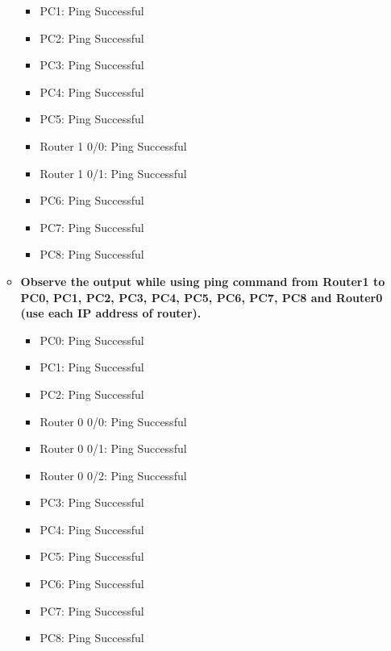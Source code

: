 \documentclass[a4paper,11pt]{article}
\begin{document}
\begin{enumerate}
\begin{itemize}
\begin{itemize}
                              \item PC1: Ping Successful
                              \item PC2: Ping Successful

                              \item PC3: Ping Successful
                              \item PC4: Ping Successful
                              \item PC5: Ping Successful
                              \item Router 1 0/0: Ping Successful
                              \item Router 1 0/1: Ping Successful
                              \item PC6: Ping Successful
                              \item PC7: Ping Successful
                              \item PC8: Ping Successful
                        \end{itemize}


                  \item \textbf{Observe the output while using ping command from Router1 to PC0, PC1, PC2, PC3, PC4, PC5,
                              PC6, PC7, PC8 and Router0 (use each IP address of router).}
                        \begin{itemize}
                              \item PC0: Ping Successful
                              \item PC1: Ping Successful
                              \item PC2: Ping Successful
                              \item Router 0 0/0: Ping Successful
                              \item Router 0 0/1: Ping Successful
                              \item Router 0 0/2: Ping Successful
                              \item PC3: Ping Successful
                              \item PC4: Ping Successful
                              \item PC5: Ping Successful

                              \item PC6: Ping Successful

                              \item PC7: Ping Successful
                              \item PC8: Ping Successful
                        \end{itemize}


            \end{itemize}

\end{enumerate}
\end{document}
